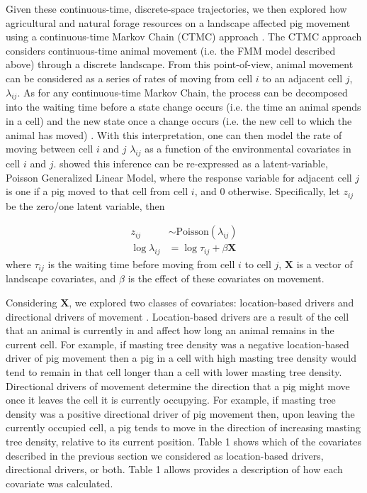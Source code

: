 \documentclass[a4paper]{article}
\begin{document}
Given these continuous-time, discrete-space trajectories, we then explored how agricultural and natural forage resources on a landscape affected pig movement using a continuous-time Markov Chain (CTMC) approach \cite{Hanks2015}. The CTMC approach considers continuous-time animal movement (i.e. the FMM model described above) through a discrete landscape. From this point-of-view, animal movement can be considered as a series of rates of moving from cell $i$ to an adjacent cell $j$, $\lambda_{ij}$.  As for any continuous-time Markov Chain, the process can be decomposed into the waiting time before a state change occurs (i.e. the time an animal spends in a cell) and the new state once a change occurs (i.e. the new cell to which the animal has moved) \citep{Allen2003a}.  With this interpretation, one can then model the rate of moving between cell $i$ and $j$ $\lambda_{ij}$ as a function of the environmental covariates in cell $i$ and $j$.  \cite{Hanks2015} showed this inference can be re-expressed as a latent-variable, Poisson Generalized Linear Model, where the response variable for adjacent cell $j$ is one if a pig moved to that cell from cell $i$, and 0 otherwise. Specifically, let $z_{ij}$ be the zero/one latent variable, then

\begin{align}
  z_{ij} &\sim \text{Poisson}(\lambda_{ij}) \\
  \log \lambda_{ij} &= \log{\tau_{ij}} + \beta \mathbf{X}
\end{align}
where $\tau_{ij}$ is the waiting time before moving from cell $i$ to cell $j$, $\mathbf{X}$ is a vector of landscape covariates, and $\beta$ is the effect of these covariates on movement.  

Considering $\mathbf{X}$, we explored two classes of covariates: location-based drivers and directional drivers of movement \citep{Hanks2015}.  Location-based drivers are a result of the cell that an animal is currently in and affect how long an animal remains in the current cell.  For example, if masting tree density was a negative location-based driver of pig movement then a pig in a cell with high masting tree density would tend to remain in that cell longer than a cell with lower masting tree density. Directional drivers of movement determine the direction that a pig might move once it leaves the cell it is currently occupying.  For example, if masting tree density was a positive directional driver of pig movement then, upon leaving the currently occupied cell, a pig tends to move in the direction of increasing masting tree density, relative to its current position. Table 1 shows which of the covariates described in the previous section we considered as location-based drivers, directional drivers, or both.  Table 1 allows provides a description of how each covariate was calculated.
\end{document}
